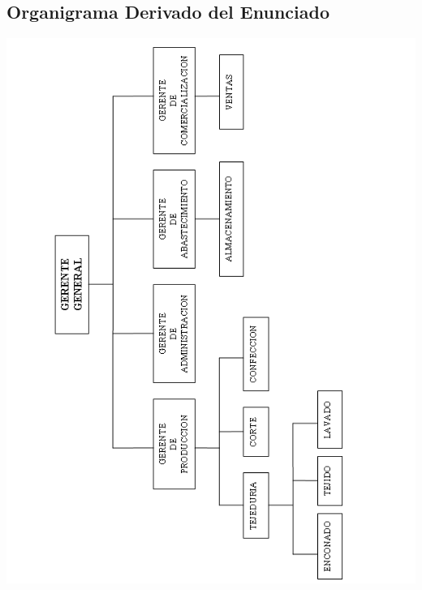 \documentclass[a4paper,10pt,titlepage]{article}
\begin{document}
\subsection{Organigrama Derivado del Enunciado}
\begin{center} \includegraphics[scale=0.75]{./dollyDiag.png} \end{center}

\newpage
\end{document}
